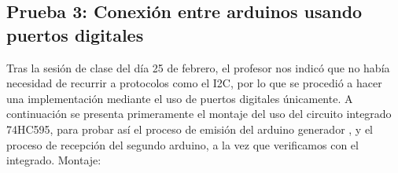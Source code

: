 \documentclass{article}
\begin{document}
\subsection{Prueba 3: Conexión entre arduinos usando puertos digitales}\label{intento3}
Tras la sesión de clase del día 25 de febrero, el profesor nos indicó que no había necesidad de recurrir a protocolos como el I2C, por lo que se procedió a hacer una implementación mediante el uso de puertos digitales únicamente. \newline A continuación se presenta primeramente el montaje del uso del circuito integrado 74HC595, para probar así el proceso de emisión del arduino generador , y el proceso de recepción del segundo arduino, a la vez que verificamos con el integrado.
\newline Montaje: \newline \newline \newline
\end{document}
